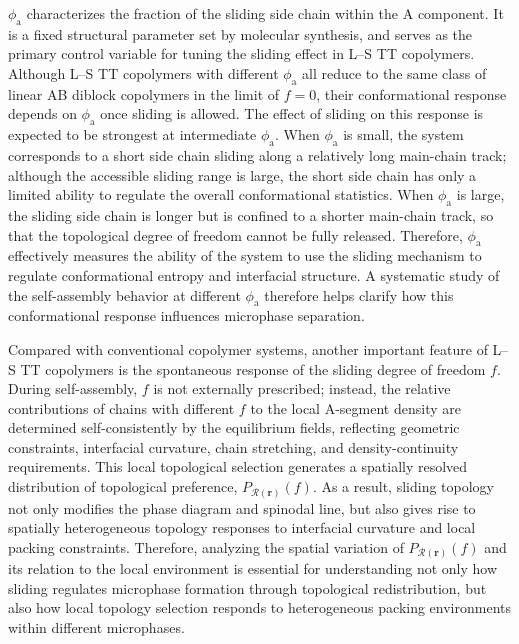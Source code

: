 $\phi_{\mathrm a}$ characterizes the fraction of the sliding side chain within the A component.
It is a fixed structural parameter set by molecular synthesis, and serves as the primary control variable for tuning the sliding effect in L--S TT copolymers.
Although L--S TT copolymers with different $\phi_{\mathrm a}$ all reduce to the same class of linear AB diblock copolymers in the limit of $f=0$, their conformational response depends on $\phi_{\mathrm a}$ once sliding is allowed.
The effect of sliding on this response is expected to be strongest at intermediate $\phi_{\mathrm a}$.
When $\phi_{\mathrm a}$ is small, the system corresponds to a short side chain sliding along a relatively long main-chain track; although the accessible sliding range is large, the short side chain has only a limited ability to regulate the overall conformational statistics.
When $\phi_{\mathrm a}$ is large, the sliding side chain is longer but is confined to a shorter main-chain track, so that the topological degree of freedom cannot be fully released.
Therefore, $\phi_{\mathrm a}$ effectively measures the ability of the system to use the sliding mechanism to regulate conformational entropy and interfacial structure.
A systematic study of the self-assembly behavior at different $\phi_{\mathrm a}$ therefore helps clarify how this conformational response influences microphase separation.


Compared with conventional copolymer systems, another important feature of L--S TT copolymers is the spontaneous response of the sliding degree of freedom $f$.
During self-assembly, $f$ is not externally prescribed; instead, the relative contributions of chains with different $f$ to the local A-segment density are determined self-consistently by the equilibrium fields, reflecting geometric constraints, interfacial curvature, chain stretching, and density-continuity requirements.
This local topological selection generates a spatially resolved distribution of topological preference, $P_{\mathcal R(\bm r)}(f)$.
As a result, sliding topology not only modifies the phase diagram and spinodal line, but also gives rise to spatially heterogeneous topology responses to interfacial curvature and local packing constraints.
Therefore, analyzing the spatial variation of $P_{\mathcal R(\bm r)}(f)$ and its relation to the local environment is essential for understanding not only how sliding regulates microphase formation through topological redistribution, but also how local topology selection responds to heterogeneous packing environments within different microphases.


